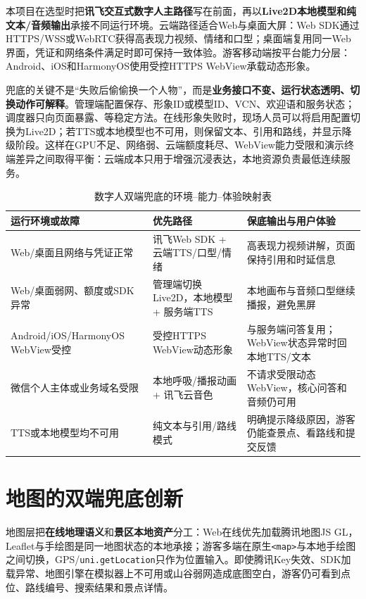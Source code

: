 本项目在选型时把\textbf{讯飞交互式数字人主路径}写在前面，再以\textbf{Live2D本地模型和纯文本/音频输出}承接不同运行环境。云端路径适合Web与桌面大屏：Web SDK通过HTTPS/WSS或WebRTC获得高表现力视频、情绪和口型；桌面端复用同一Web界面，凭证和网络条件满足时即可保持一致体验。游客移动端按平台能力分层：Android、iOS和HarmonyOS使用受控HTTPS WebView承载动态形象。

兜底的关键不是“失败后偷偷换一个人物”，而是\textbf{业务接口不变、运行状态透明、切换动作可解释}。管理端配置保存、形象ID或模型ID、VCN、欢迎语和服务状态；调度器只向页面暴露、等稳定方法。在线形象失败时，现场人员可以将启用配置切换为Live2D；若TTS或本地模型也不可用，则保留文本、引用和路线，并显示降级阶段。这样在GPU不足、网络弱、云端额度耗尽、WebView能力受限和演示终端差异之间取得平衡：云端成本只用于增强沉浸表达，本地资源负责最低连续服务。

\begin{table}[H]
  \centering
  \small
  \caption{数字人双端兜底的环境--能力--体验映射表}\label{tab:digital-human-fallback}
  \begin{tabularx}{\textwidth}{p{}p{}X}
    \toprule
    运行环境或故障 & 优先路径 & 保底输出与用户体验 \\
    \midrule
    Web/桌面且网络与凭证正常 & 讯飞Web SDK + 云端TTS/口型/情绪 & 高表现力视频讲解，页面保持引用和时延信息 \\
    Web/桌面弱网、额度或SDK异常 & 管理端切换Live2D，本地模型 + 服务端TTS & 本地画布与音频口型继续播报，避免黑屏 \\
    Android/iOS/HarmonyOS WebView受控 & 受控HTTPS WebView动态形象 & 与服务端问答复用；WebView状态异常时回本地TTS/文本 \\
    微信个人主体或业务域名受限 & 本地呼吸/播报动画 + 讯飞云音色 & 不请求受限动态WebView，核心问答和音频仍可用 \\
    TTS或本地模型均不可用 & 纯文本与引用/路线模式 & 明确提示降级原因，游客仍能查景点、看路线和提交反馈 \\
    \bottomrule
  \end{tabularx}
\end{table}

\section{地图的双端兜底创新}

地图层把\textbf{在线地理语义}和\textbf{景区本地资产}分工：Web在线优先加载腾讯地图JS GL，Leaflet与手绘图是同一地图状态的本地承接；游客多端在原生\texttt{<map>}与本地手绘图之间切换，GPS/\texttt{uni.getLocation}只作为位置输入。即使腾讯Key失效、SDK加载异常、地图引擎在模拟器上不可用或山谷弱网造成底图空白，游客仍可看到点位、路线编号、搜索结果和景点详情。

